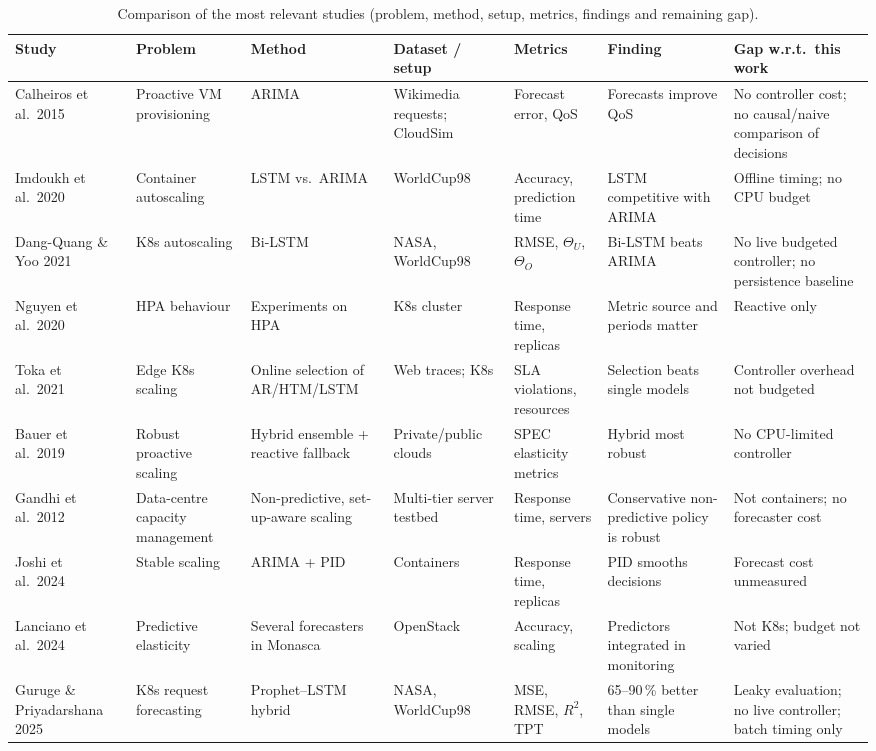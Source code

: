 \documentclass[conference,a4paper]{IEEEtran}
\begin{document}
\begin{table}[!t]\centering
\caption{Comparison of the most relevant studies (problem, method, setup, metrics, findings and remaining gap).}\label{tab:lit}
\scriptsize
\begin{tabularx}{\textwidth}{@{}>{\raggedright\arraybackslash}p{1.75cm}LLLLLL@{}}\toprule
Study & Problem & Method & Dataset / setup & Metrics & Finding & Gap w.r.t.\ this work \\ \midrule
Calheiros et al.\ 2015~\cite{calheiros2015} & Proactive VM provisioning & ARIMA & Wikimedia requests; CloudSim & Forecast error, QoS & Forecasts improve QoS & No controller cost; no causal/naive comparison of decisions \\
Imdoukh et al.\ 2020~\cite{imdoukh2020} & Container autoscaling & LSTM vs.\ ARIMA & WorldCup98 & Accuracy, prediction time & LSTM competitive with ARIMA & Offline timing; no CPU budget \\
Dang-Quang \& Yoo 2021~\cite{dangquang2021} & K8s autoscaling & Bi-LSTM & NASA, WorldCup98 & RMSE, $\Theta_U$, $\Theta_O$ & Bi-LSTM beats ARIMA & No live budgeted controller; no persistence baseline \\
Nguyen et al.\ 2020~\cite{nguyen2020} & HPA behaviour & Experiments on HPA & K8s cluster & Response time, replicas & Metric source and periods matter & Reactive only \\
Toka et al.\ 2021~\cite{toka2021} & Edge K8s scaling & Online selection of AR/HTM/LSTM & Web traces; K8s & SLA violations, resources & Selection beats single models & Controller overhead not budgeted \\
Bauer et al.\ 2019~\cite{bauer2019} & Robust proactive scaling & Hybrid ensemble + reactive fallback & Private/public clouds & SPEC elasticity metrics & Hybrid most robust & No CPU-limited controller \\
Gandhi et al.\ 2012~\cite{gandhi2012} & Data-centre capacity management & Non-predictive, set-up-aware scaling & Multi-tier server testbed & Response time, servers & Conservative non-predictive policy is robust & Not containers; no forecaster cost \\
Joshi et al.\ 2024~\cite{joshi2024} & Stable scaling & ARIMA + PID & Containers & Response time, replicas & PID smooths decisions & Forecast cost unmeasured \\
Lanciano et al.\ 2024~\cite{lanciano2024} & Predictive elasticity & Several forecasters in Monasca & OpenStack & Accuracy, scaling & Predictors integrated in monitoring & Not K8s; budget not varied \\
Guruge \& Priyadarshana 2025~\cite{guruge2025} & K8s request forecasting & Prophet--LSTM hybrid & NASA, WorldCup98 & MSE, RMSE, $R^2$, TPT & 65--90\,\% better than single models & Leaky evaluation; no live controller; batch timing only \\
\bottomrule\end{tabularx}
\end{table}
\end{document}
